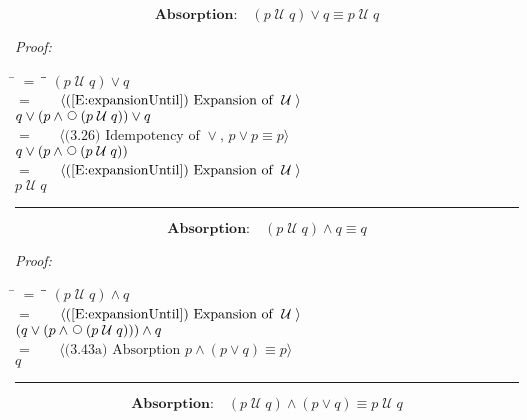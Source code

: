 \documentclass[fleqn, leqno]{article}
\newcommand{\lgap}{2pt}                             %
\newcommand{\mymathindent}{24pt}                    %
\newcommand{\Until}{\;\mathcal{U}\;}
\newcommand{\Next}{\;\,\text{\raisebox{3.5pt}{\circle{6}}}}
\newcommand{\myqed}{\rule[-.23ex]{1.2ex}{2.0ex}}
\newcommand{\myqedtab}{\hspace{388.5pt}}              %
\newcommand{\Gll} {\langle}                         %
\newcommand{\Ggg} {\rangle}                         %
\newcommand{\Hint}[1]     {\ \ \ $\Gll              \mbox{#1} \Ggg$ }   %
\begin{document}
\begin{equation}\label{E:untilOrQ}
\textbf{Absorption:}\quad (p \Until q) \lor q \equiv p \Until q
\end{equation}

\emph{Proof:}
\begin{tabbing}
\hspace{\mymathindent} \= $= \;$ \= \myqedtab \= \kill
  \> \>   $(p \Until q) \lor q$\\[\lgap]
  \> $=$  \>  \Hint{(\ref{E:expansionUntil}) Expansion of $\Until$}\\[\lgap]
  \> \>   $q \lor (p \land \Next(p \Until q)) \lor q$\\[\lgap]
  \> $=$  \>  \Hint{(3.26) Idempotency of $\lor$, $p \lor p \equiv p$}\\[\lgap]
  \> \>   $q \lor (p \land \Next(p \Until q))$\\[\lgap]
  \> $=$  \>  \Hint{(\ref{E:expansionUntil}) Expansion of $\Until$}\\[\lgap]
  \> \>   $p \Until q$ \> \myqed
\end{tabbing}

\begin{equation}\label{E:untilAndQ}
\textbf{Absorption:}\quad (p \Until q) \land q \equiv q
\end{equation}

\emph{Proof:}
\begin{tabbing}
\hspace{\mymathindent} \= $= \;$ \= \myqedtab \= \kill
  \> \>   $(p \Until q) \land q$\\[\lgap]
  \> $=$  \>  \Hint{(\ref{E:expansionUntil}) Expansion of $\Until$}\\[\lgap]
  \> \>   $(q \lor (p \land \Next(p \Until q))) \land q$\\[\lgap]
  \> $=$  \>  \Hint{(3.43a) Absorption $p \land (p \lor q) \equiv p$}\\[\lgap]
  \> \>   $q$ \> \myqed
\end{tabbing}

\begin{equation}\label{E:untilAndOr}
\textbf{Absorption:}\quad (p \Until q) \land (p \lor q) \equiv p \Until q
\end{equation}
\end{document}
